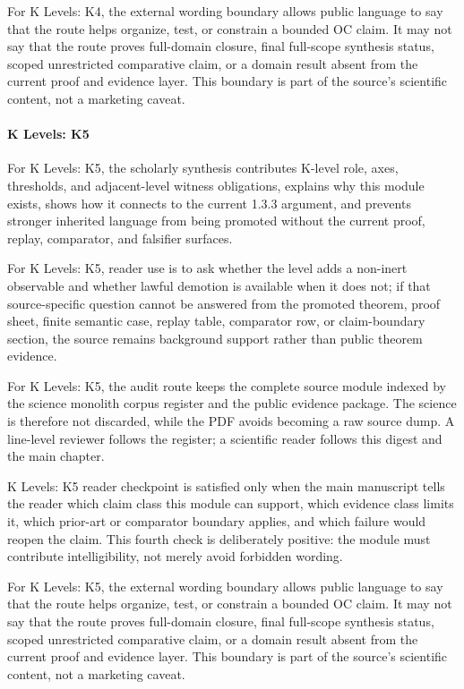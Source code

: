 For K Levels: K4, the external wording boundary allows public language to say that the route helps organize, test, or constrain a bounded OC claim. It may not say that the route proves full-domain closure, final full-scope synthesis status, scoped unrestricted comparative claim, or a domain result absent from the current proof and evidence layer. This boundary is part of the source's scientific content, not a marketing caveat.


\paragraph{K Levels: K5}

For K Levels: K5, the scholarly synthesis contributes K-level role, axes, thresholds, and adjacent-level witness obligations, explains why this module exists, shows how it connects to the current 1.3.3 argument, and prevents stronger inherited language from being promoted without the current proof, replay, comparator, and falsifier surfaces.


For K Levels: K5, reader use is to ask whether the level adds a non-inert observable and whether lawful demotion is available when it does not; if that source-specific question cannot be answered from the promoted theorem, proof sheet, finite semantic case, replay table, comparator row, or claim-boundary section, the source remains background support rather than public theorem evidence.


For K Levels: K5, the audit route keeps the complete source module indexed by the science monolith corpus register and the public evidence package. The science is therefore not discarded, while the PDF avoids becoming a raw source dump. A line-level reviewer follows the register; a scientific reader follows this digest and the main chapter.


K Levels: K5 reader checkpoint is satisfied only when the main manuscript tells the reader which claim class this module can support, which evidence class limits it, which prior-art or comparator boundary applies, and which failure would reopen the claim. This fourth check is deliberately positive: the module must contribute intelligibility, not merely avoid forbidden wording.


For K Levels: K5, the external wording boundary allows public language to say that the route helps organize, test, or constrain a bounded OC claim. It may not say that the route proves full-domain closure, final full-scope synthesis status, scoped unrestricted comparative claim, or a domain result absent from the current proof and evidence layer. This boundary is part of the source's scientific content, not a marketing caveat.


